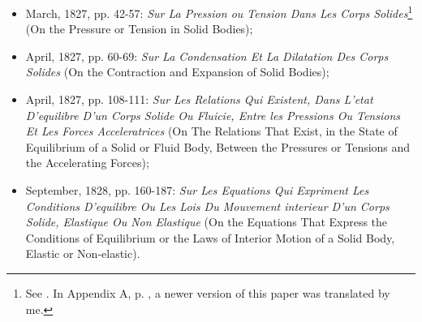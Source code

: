 \begin{itemize}
	\setlength\itemsep{1pt}
	\item[1.] March, 1827, pp. 42-57: \emph{Sur La Pression ou Tension Dans Les Corps Solides}\footnote{See \cite{cauchy_1827}. In Appendix A, p. \pageref{ch:appA}, a newer version of this paper was translated by me.} (On the Pressure or Tension in Solid Bodies);
	\item[2.] April, 1827, pp. 60-69: \emph{Sur La Condensation Et La Dilatation Des Corps Solides} (On the Contraction and Expansion of Solid Bodies);
    \item[3.] April, 1827, pp. 108-111: \emph{Sur Les Relations Qui Existent, Dans L'etat D'equilibre D'un Corps Solide Ou Fluicie, Entre
les Pressions Ou Tensions Et Les Forces Acceleratrices} (On The Relations That Exist, in the State of Equilibrium of a Solid or Fluid Body, Between the Pressures or Tensions and the Accelerating Forces);
	\item[4.] September, 1828, pp. 160-187: \emph{Sur Les Equations Qui Expriment Les Conditions D'equilibre Ou Les Lois Du Mouvement interieur D'un Corps Solide, Elastique Ou Non Elastique} (On the Equations That Express the Conditions of Equilibrium or the Laws of Interior Motion of a Solid Body, Elastic or Non-elastic).
\end{itemize}
